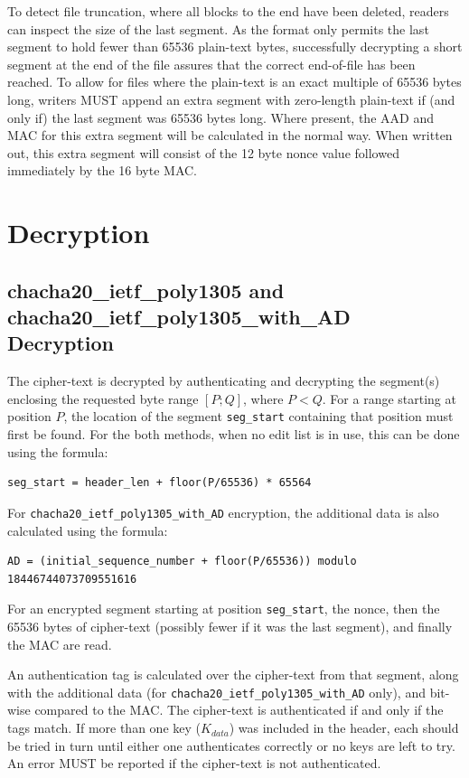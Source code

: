 \documentclass[10pt]{article}
\newcommand{\kw}[1]{\texttt{#1}}
\begin{document}
To detect file truncation,
where all blocks to the end have been deleted,
readers can inspect the size of the last segment.
As the format only permits the last segment to hold fewer than 65536 plain-text bytes,
successfully decrypting a short segment at the end of the file assures that the correct end-of-file has been reached.
To allow for files where the plain-text is an exact multiple of 65536 bytes long,
writers MUST append an extra segment with zero-length plain-text if (and only if)
the last segment was 65536 bytes long.
Where present,
the AAD and MAC for this extra segment will be calculated in the normal way.
When written out,
this extra segment will consist of the 12 byte nonce value followed immediately by the 16 byte MAC.

\section{Decryption}

\subsection{chacha20\_ietf\_poly1305 and chacha20\_ietf\_poly1305\_with\_AD Decryption}

The cipher-text is decrypted by authenticating and decrypting the segment(s) enclosing the requested byte range $[P;Q]$,
where $P<Q$.
For a range starting at position $P$, the location of the segment \kw{seg\_start} containing that position must
first be found.
For the both methods, when no edit list is in use, this can be done using the formula:

\begin{verbatim}
seg_start = header_len + floor(P/65536) * 65564
\end{verbatim}

For \kw{chacha20\_ietf\_poly1305\_with\_AD} encryption,
the additional data is also calculated using the formula:

\begin{verbatim}
AD = (initial_sequence_number + floor(P/65536)) modulo 18446744073709551616
\end{verbatim}

For an encrypted segment starting at position \kw{seg\_start}, the nonce, then the 65536 bytes of cipher-text
(possibly fewer if it was the last segment), and finally the MAC are read.

An authentication tag is calculated over the cipher-text from that segment,
along with the additional data (for \kw{chacha20\_ietf\_poly1305\_with\_AD} only),
and bit-wise compared to the MAC.
The cipher-text is authenticated if and only if the tags match.
If more than one key ($K_{data}$) was included in the header,
each should be tried in turn until either one authenticates correctly or no keys are left to try.
An error MUST be reported if the cipher-text is not authenticated.
\end{document}
